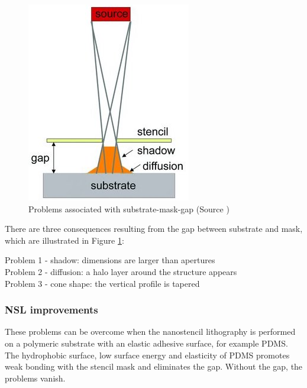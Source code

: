 \documentclass[journal, a4paper]{IEEEtran}
\begin{document}
\begin{figure}[hbt!]
\begin{center}
\includegraphics[width=0.8\columnwidth]{05gap.jpg}
\caption{Problems associated with substrate-mask-gap (Source \cite{paper})}
\label{fig:gap}
\end{center}
\end{figure}

There are three consequences resulting from the gap between substrate and mask, which are illustrated in Figure \ref{fig:gap}: 

Problem 1 - shadow: dimensions are larger than apertures \\Problem 2 - diffusion: a halo layer around the structure appears \\Problem 3 - cone shape: the vertical profile is tapered

\subsubsection{NSL improvements} 
These problems can be overcome when the nanostencil lithography is performed on a polymeric substrate with an elastic adhesive surface, for example PDMS. The hydrophobic surface, low surface energy and elasticity of PDMS promotes weak bonding with the stencil mask and eliminates the gap. Without the gap, the problems vanish.
\end{document}

